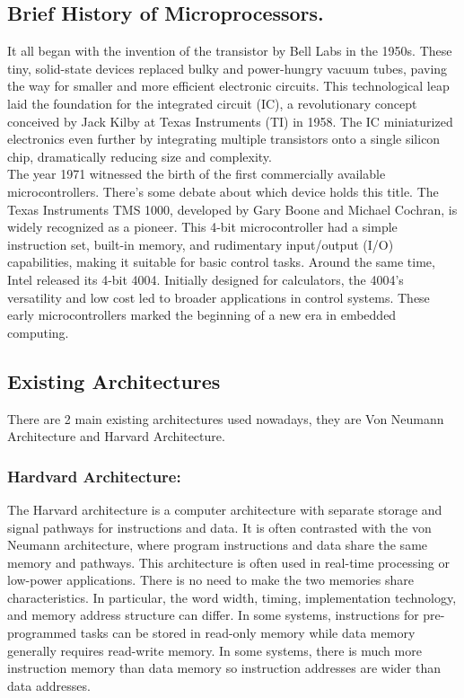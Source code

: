 \documentclass[9pt,a4paper,twoside]{tau}
\begin{document}
    \subsection{Brief History of Microprocessors.}
    It all began with the invention of the transistor by Bell Labs in the 1950s. These tiny, solid-state devices replaced bulky and power-hungry vacuum tubes, paving the way for smaller and more efficient electronic circuits. This technological leap laid the foundation for the integrated circuit (IC), a revolutionary concept conceived by Jack Kilby at Texas Instruments (TI) in 1958. The IC miniaturized electronics even further by integrating multiple transistors onto a single silicon chip, dramatically reducing size and complexity. \\
    The year 1971 witnessed the birth of the first commercially available microcontrollers. There's some debate about which device holds this title. The Texas Instruments TMS 1000, developed by Gary Boone and Michael Cochran, is widely recognized as a pioneer. This 4-bit microcontroller had a simple instruction set, built-in memory, and rudimentary input/output (I/O) capabilities, making it suitable for basic control tasks. Around the same time, Intel released its 4-bit 4004. Initially designed for calculators, the 4004's versatility and low cost led to broader applications in control systems. These early microcontrollers marked the beginning of a new era in embedded computing.

    \subsection{Existing Architectures}
    There are 2 main existing architectures used nowadays, they are Von Neumann Architecture and Harvard Architecture.

        \subsubsection{Hardvard Architecture:}
        The Harvard architecture is a computer architecture with separate storage and signal pathways for instructions and data. It is often contrasted with the von Neumann architecture, where program instructions and data share the same memory and pathways. This architecture is often used in real-time processing or low-power applications.
        There is no need to make the two memories share characteristics. In particular, the word width, timing, implementation technology, and memory address structure can differ. In some systems, instructions for pre-programmed tasks can be stored in read-only memory while data memory generally requires read-write memory. In some systems, there is much more instruction memory than data memory so instruction addresses are wider than data addresses.
    
\end{document}
